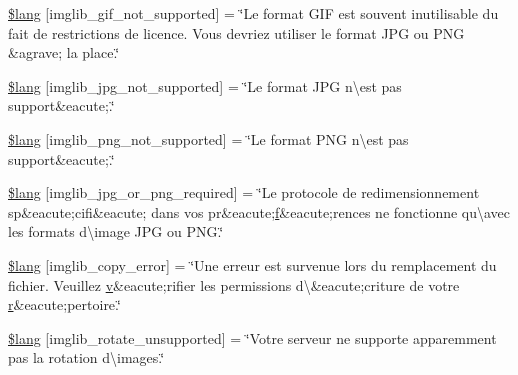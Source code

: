 \begin{DoxyCompactItemize}
\item 
\hyperlink{application_2language_2french_2imglib__lang_8php_a235a59a6660145fc136b3933b5b10675}{\$lang} \mbox{[}\textquotesingle{}imglib\+\_\+gif\+\_\+not\+\_\+supported\textquotesingle{}\mbox{]} = \char`\"{}Le format G\+IF est souvent inutilisable du fait de restrictions de licence. Vous devriez utiliser le format J\+PG ou P\+NG \&agrave; la place.\char`\"{}
\item 
\hyperlink{application_2language_2french_2imglib__lang_8php_a4acdc927c172bab1370b2897c667c552}{\$lang} \mbox{[}\textquotesingle{}imglib\+\_\+jpg\+\_\+not\+\_\+supported\textquotesingle{}\mbox{]} = \char`\"{}Le format J\+PG n\textbackslash{}\textquotesingle{}est pas support\&eacute;.\char`\"{}
\item 
\hyperlink{application_2language_2french_2imglib__lang_8php_a0b7ea2e2fbd03eb72fe9d969adb643dd}{\$lang} \mbox{[}\textquotesingle{}imglib\+\_\+png\+\_\+not\+\_\+supported\textquotesingle{}\mbox{]} = \char`\"{}Le format P\+NG n\textbackslash{}\textquotesingle{}est pas support\&eacute;.\char`\"{}
\item 
\hyperlink{application_2language_2french_2imglib__lang_8php_a2878e2b878871cd8010970f865d70e71}{\$lang} \mbox{[}\textquotesingle{}imglib\+\_\+jpg\+\_\+or\+\_\+png\+\_\+required\textquotesingle{}\mbox{]} = \char`\"{}Le protocole de redimensionnement sp\&eacute;cifi\&eacute; dans vos pr\&eacute;\hyperlink{jquery-ui_8min_8js_a9cf09a2972472098a4c689fd988f4dfc}{f}\&eacute;rences ne fonctionne qu\textbackslash{}\textquotesingle{}avec les formats d\textbackslash{}\textquotesingle{}image J\+PG ou P\+N\+G.\char`\"{}
\item 
\hyperlink{application_2language_2french_2imglib__lang_8php_a012b6a0d2b3a8ef934e8783d2fbd6535}{\$lang} \mbox{[}\textquotesingle{}imglib\+\_\+copy\+\_\+error\textquotesingle{}\mbox{]} = \char`\"{}Une erreur est survenue lors du remplacement du fichier. Veuillez \hyperlink{_chart_8min_8js_afc3dd12de12777f6e20b4c93b7e7cb96}{v}\&eacute;rifier les permissions d\textbackslash{}\textquotesingle{}\&eacute;criture de votre \hyperlink{jquery-1_811_81_8min_8js_a96f65b399314d93896076ceb474b6b9b}{r}\&eacute;pertoire.\char`\"{}
\item 
\hyperlink{application_2language_2french_2imglib__lang_8php_ab1c77c6b58fc5bf8e979ab4237ec87e7}{\$lang} \mbox{[}\textquotesingle{}imglib\+\_\+rotate\+\_\+unsupported\textquotesingle{}\mbox{]} = \char`\"{}Votre serveur ne supporte apparemment pas la rotation d\textbackslash{}\textquotesingle{}images.\char`\"{}
\item 

\end{DoxyCompactItemize}
